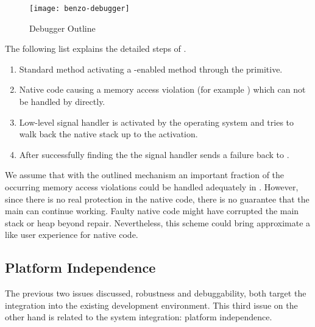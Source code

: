 \begin{figure}[h]
	\centering
	\texttt{[image: benzo-debugger]}
	\caption{\B Debugger Outline}
\end{figure}

The following list explains the detailed steps of .
\begin{enumerate}
	\item Standard \PH method activating a \B-enabled method through the  primitive.
	\item Native code causing a memory access violation (for example ) which can not be handled by \PH directly.
	\item Low-level signal handler is activated by the operating system and tries to walk back the native stack up to the  activation.
	\item After successfully finding the  the signal handler sends a \B failure back to \PH.
\end{enumerate}

\noindent We assume that with the outlined mechanism an important fraction of the occurring memory access violations could be handled adequately in \PH.
However, since there is no real protection in the native code, there is no guarantee that the main \PH \VM can continue working.
Faulty native code might have corrupted the main \PH stack or heap beyond repair.
Nevertheless, this scheme could bring approximate a \PH like user experience for native \B code.


\subsection{Platform Independence}
The previous two issues discussed, robustness and debuggability, both target the integration into the existing \PH development environment.
This third issue on the other hand is related to the system integration: platform independence.


